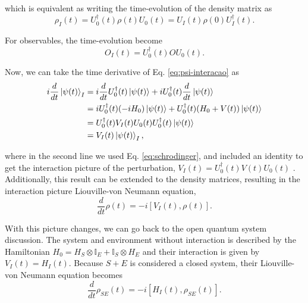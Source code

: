 \noindent which is equivalent as writing the time-evolution of the density matrix as
\begin{equation}
    {\rho}_I (t) = {U}_0^\dagger (t) {\rho} (t) {U}_0 (t) = {U}_I (t) {\rho} (0) {U}_I^\dagger (t).
\end{equation}

\noindent For observables, the time-evolution become
\begin{equation}
    {O}_I (t) = {U}_0^\dagger (t) {O} {U}_0 (t).
\end{equation}

\noindent Now, we can take the time derivative of Eq. \eqref{eq:psi-interacao} as
\begin{equation}
	\begin{split}
		 i \frac{d}{dt} \ket{\psi(t)}_I &= i \frac{d}{dt} {U}_0^\dagger (t) \ket{\psi(t)} + i {U}_0^\dagger (t) \frac{d}{dt} \ket{\psi(t)}\\
		 &= i  {U}_0^\dagger (t) (-i H_0 ) \ket{\psi(t)} + {U}_0^\dagger (t) (H_0 + V(t)) \ket{\psi(t)} \\
		 &= {U}_0^\dagger (t) V_I (t) {U}_0 (t) {U}_0^\dagger (t) \ket{\psi (t)}\\
		 &= {V}_I (t) \ket{\psi(t)}_I,
	\end{split}
\end{equation}

\noindent where in the second line we used Eq. \eqref{eq:schrodinger}, and included an identity to get the interaction picture of the perturbation, ${V}_I (t) = {U}_0^\dagger (t) {V} (t) {U}_0 (t)$ \cite{sakurai-1994, petruccione-book}. Additionally, this result can be extended to the density matrices, resulting in the interaction picture Liouville-von Neumann equation,
\begin{equation}
    \frac{d}{dt} {\rho}(t) = -i [{V}_I (t), {\rho}(t)].
\end{equation}

With this picture changes, we can go back to the open quantum system discussion. The system and environment without interaction is described by the Hamiltonian ${H}_0 = {H}_S \otimes \mathbb{I}_E + \mathbb{I}_S \otimes {H}_E$ and their interaction is given by ${V}_I(t) = {H}_I(t)$. Because $S+E$ is considered a closed system, their Liouville-von Neumann equation becomes
\begin{equation}
    \frac{d}{dt} {\rho}_{SE}(t) = -i [{H}_I (t), {\rho}_{SE}(t)].
    \label{eq:neumann-diferencial}
\end{equation}

